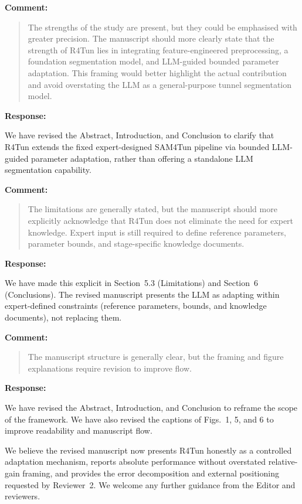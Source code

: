 \documentclass[11pt,a4paper]{article}
\newenvironment{commentblock}{%
  \par\smallskip\noindent\textbf{Comment:}\par
  \begin{quote}\itshape\color{black}
}{%
  \end{quote}\smallskip
}
\newenvironment{responseblock}{%
  \par\smallskip\noindent\textbf{Response:}\par
  \begingroup\color{responsegreen}
}{%
  \endgroup\smallskip
}
\begin{document}
\begin{commentblock}
The strengths of the study are present, but they could be emphasised with greater precision. The manuscript should more clearly state that the strength of R4Tun lies in integrating feature-engineered preprocessing, a foundation segmentation model, and LLM-guided bounded parameter adaptation. This framing would better highlight the actual contribution and avoid overstating the LLM as a general-purpose tunnel segmentation model.
\end{commentblock}
\begin{responseblock}
We have revised the Abstract, Introduction, and Conclusion to clarify that R4Tun extends the fixed expert-designed SAM4Tun pipeline via bounded LLM-guided parameter adaptation, rather than offering a standalone LLM segmentation capability.
\end{responseblock}

\begin{commentblock}
The limitations are generally stated, but the manuscript should more explicitly acknowledge that R4Tun does not eliminate the need for expert knowledge. Expert input is still required to define reference parameters, parameter bounds, and stage-specific knowledge documents.
\end{commentblock}
\begin{responseblock}
We have made this explicit in Section~5.3 (Limitations) and Section~6 (Conclusions). The revised manuscript presents the LLM as adapting within expert-defined constraints (reference parameters, bounds, and knowledge documents), not replacing them.
\end{responseblock}

\begin{commentblock}
The manuscript structure is generally clear, but the framing and figure explanations require revision to improve flow.
\end{commentblock}
\begin{responseblock}
We have revised the Abstract, Introduction, and Conclusion to reframe the scope of the framework. We have also revised the captions of Figs.~1, 5, and 6 to improve readability and manuscript flow.
\end{responseblock}

\bigskip
\noindent We believe the revised manuscript now presents R4Tun honestly as a controlled adaptation mechanism, reports absolute performance without overstated relative-gain framing, and provides the error decomposition and external positioning requested by Reviewer~2. We welcome any further guidance from the Editor and reviewers.
\end{document}

